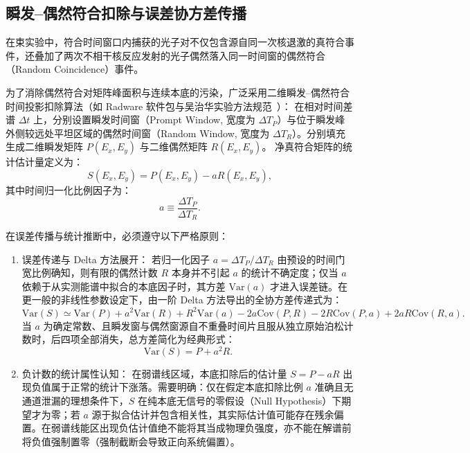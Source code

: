 \subsection{瞬发--偶然符合扣除与误差协方差传播}\label{subsec:5-6-3}

在束实验中，符合时间窗口内捕获的光子对不仅包含源自同一次核退激的真符合事件，还叠加了两次不相干核反应发射的光子偶然落入同一时间窗的偶然符合（Random Coincidence）事件。

为了消除偶然符合对矩阵峰面积与连续本底的污染，广泛采用二维瞬发--偶然符合时间投影扣除算法（如 Radware 软件包与吴治华实验方法规范~\cite{book-wu-nuclear-experiment-methods}）：
在相对时间差谱 $\Delta t$ 上，分别设置瞬发时间窗（Prompt Window, 宽度为 $\Delta T_P$）与位于瞬发峰外侧较远处平坦区域的偶然时间窗（Random Window, 宽度为 $\Delta T_R$）。分别填充生成二维瞬发矩阵 $P(E_x, E_y)$ 与二维偶然矩阵 $R(E_x, E_y)$。
净真符合矩阵的统计估计量定义为：
\begin{equation}\label{eq:5-6-prompt-random}
S(E_x, E_y) = P(E_x, E_y) - a R(E_x, E_y),
\end{equation}
其中时间归一化比例因子为：
\begin{equation}\label{eq:5-6-norm-factor}
a \equiv \frac{\Delta T_P}{\Delta T_R}.
\end{equation}

在误差传播与统计推断中，必须遵守以下严格原则：
\begin{enumerate}
\item 误差传递与 Delta 方法展开：
若归一化因子 $a = \Delta T_P / \Delta T_R$ 由预设的时间门宽比例确知，则有限的偶然计数 $R$ 本身并不引起 $a$ 的统计不确定度；仅当 $a$ 依赖于从实测能谱中拟合的本底因子时，其方差 $\mathrm{Var}(a)$ 才进入误差链。在更一般的非线性参数设定下，由一阶 Delta 方法导出的全协方差传递式为：
\begin{equation}\label{eq:5-6-var-cov-expanded}
\mathrm{Var}(S) \simeq \mathrm{Var}(P) + a^2 \mathrm{Var}(R) + R^2 \mathrm{Var}(a) - 2a \mathrm{Cov}(P, R) - 2R \mathrm{Cov}(P, a) + 2a R \mathrm{Cov}(R, a).
\end{equation}
当 $a$ 为确定常数、且瞬发窗与偶然窗源自不重叠时间片且服从独立原始泊松计数时，后四项全部消失，总方差简化为经典形式：
\begin{equation}\label{eq:5-6-var-net}
\mathrm{Var}(S) = P + a^2 R.
\end{equation}
\item 负计数的统计属性认知：
在弱谱线区域，本底扣除后的估计量 $S = P - aR$ 出现负值属于正常的统计下涨落。需要明确：仅在假定本底扣除比例 $a$ 准确且无通道泄漏的理想条件下，$S$ 在纯本底无信号的零假设（Null Hypothesis）下期望才为零；若 $a$ 源于拟合估计并包含相关性，其实际估计值可能存在残余偏置。在弱谱线能区出现负估计值绝不能将其当成物理负强度，亦不能在解谱前将负值强制置零（强制截断会导致正向系统偏置）。
\end{enumerate}

